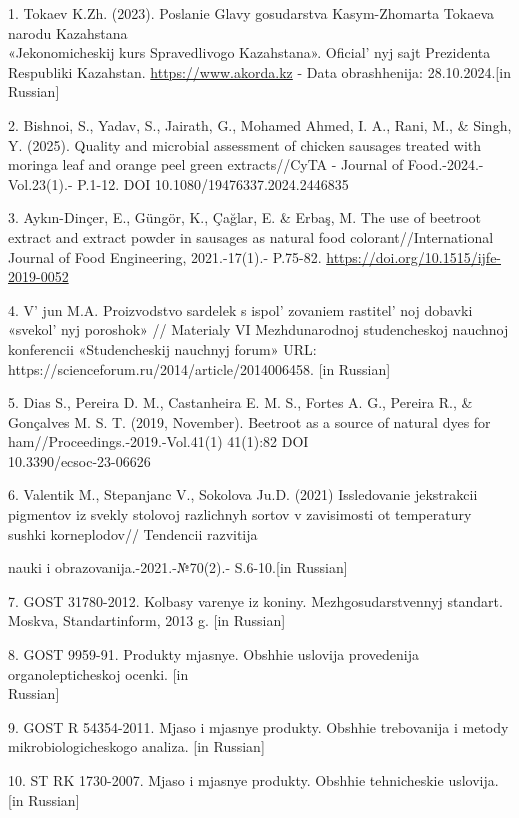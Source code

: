 \begin{references}
1. Tokaev K.Zh. (2023). Poslanie Glavy gosudarstva Kasym-Zhomarta
Tokaeva narodu Kazahstana \\«Jekonomicheskij kurs Spravedlivogo
Kazahstana». Oficial' nyj sajt Prezidenta Respubliki
Kazahstan.
\href{https://www.akorda.kz/ru/poslanie-glavy-gosudarstva-kasym-zhomarta-tokaeva-narodu-kazahstana-ekonomicheskiy-kurs-spravedlivogo-kazahstana-18588}{https://www.akorda.kz}
- Data obrashhenija: 28.10.2024.{[}in Russian{]}

2. Bishnoi, S., Yadav, S., Jairath, G., Mohamed Ahmed, I. A., Rani, M.,
\& Singh, Y. (2025). Quality and microbial assessment of chicken
sausages treated with moringa leaf and orange peel green extracts//CyTA
- Journal of Food.-2024.-Vol.23(1).- P.1-12.
DOI 10.1080/19476337.2024.2446835

3. Aykın-Dinçer, E., Güngör, K., Çağlar, E. \& Erbaş, M. The use of
beetroot extract and extract powder in sausages as natural food
colorant//International Journal of Food Engineering, 2021.-17(1).-
P.75-82. \url{https://doi.org/10.1515/ijfe-2019-0052}{}

4. V' jun M.A. Proizvodstvo sardelek s
ispol' zovaniem rastitel' noj dobavki
«svekol' nyj poroshok» // Materialy VI Mezhdunarodnoj
studencheskoj nauchnoj konferencii «Studencheskij nauchnyj forum» URL:
https://scienceforum.ru/2014/article/2014006458. {[}in Russian{]}

5. Dias S., Pereira D. M., Castanheira E. M. S., Fortes A. G., Pereira
R., \& Gonçalves M. S. T. (2019, November). Beetroot as a source of
natural dyes for ham//Proceedings.-2019.-Vol.41(1) 41(1):82 DOI\\
10.3390/ecsoc-23-06626

6. Valentik M., Stepanjanc V., Sokolova Ju.D. (2021) Issledovanie
jekstrakcii pigmentov iz svekly stolovoj razlichnyh sortov v zavisimosti
ot temperatury sushki korneplodov// Tendencii razvitija

nauki i obrazovanija.-2021.-№70(2).- S.6-10.{[}in Russian{]}

7. GOST 31780-2012. Kolbasy varenye iz koniny. Mezhgosudarstvennyj
standart. Moskva, Standartinform, 2013 g. {[}in Russian{]}

8. GOST 9959-91. Produkty mjasnye. Obshhie uslovija provedenija
organolepticheskoj ocenki. {[}in \\Russian{]}

9. GOST R 54354-2011. Mjaso i mjasnye produkty. Obshhie trebovanija i
metody mikrobiologicheskogo analiza. {[}in Russian{]}

10. ST RK 1730-2007. Mjaso i mjasnye produkty. Obshhie tehnicheskie
uslovija. {[}in Russian{]}
\end{references}

